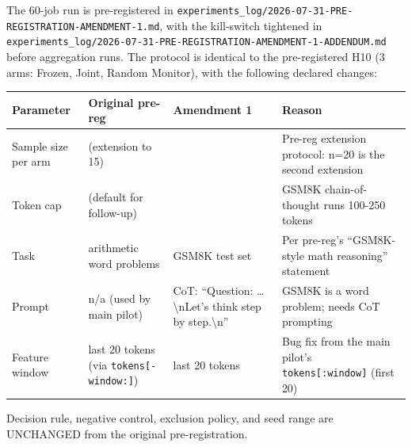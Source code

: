 \documentclass[
]{article}
\newcounter{none} %
\begin{document}
The 60-job run is pre-registered in
\texttt{experiments\_log/2026-07-31-PRE-REGISTRATION-AMENDMENT-1.md},
with the kill-switch tightened in
\texttt{experiments\_log/2026-07-31-PRE-REGISTRATION-AMENDMENT-1-ADDENDUM.md}
before aggregation runs. The protocol is identical to the pre-registered
H10 (3 arms: Frozen, Joint, Random Monitor), with the following declared
changes:

{\def\LTcaptype{none} %
\begin{longtable}[]{@{}
  >{\raggedright\arraybackslash}p{}
  >{\raggedright\arraybackslash}p{}
  >{\raggedright\arraybackslash}p{}
  >{\raggedright\arraybackslash}p{}@{}}
\toprule\noalign{}
\begin{minipage}[b]{\linewidth}\raggedright
Parameter
\end{minipage} & \begin{minipage}[b]{\linewidth}\raggedright
Original pre-reg
\end{minipage} & \begin{minipage}[b]{\linewidth}\raggedright
Amendment 1
\end{minipage} & \begin{minipage}[b]{\linewidth}\raggedright
Reason
\end{minipage} \\
\midrule\noalign{}
\endhead
\bottomrule\noalign{}
\endlastfoot
Sample size per arm & 5 (extension to 15) & 20 & Pre-reg extension
protocol: n=20 is the second extension \\
Token cap & 80 (default for follow-up) & 200 & GSM8K chain-of-thought
runs 100-250 tokens \\
Task & arithmetic word problems & GSM8K test set & Per pre-reg's
``GSM8K-style math reasoning'' statement \\
Prompt & n/a (used by main pilot) & CoT: ``Question:
\ldots\textbackslash nLet's think step by step.\textbackslash n'' &
GSM8K is a word problem; needs CoT prompting \\
Feature window & last 20 tokens (via \texttt{tokens{[}-window:{]}}) &
last 20 tokens & Bug fix from the main pilot's
\texttt{tokens{[}:window{]}} (first 20) \\
\end{longtable}
}

Decision rule, negative control, exclusion policy, and seed range are
UNCHANGED from the original pre-registration.
\end{document}
